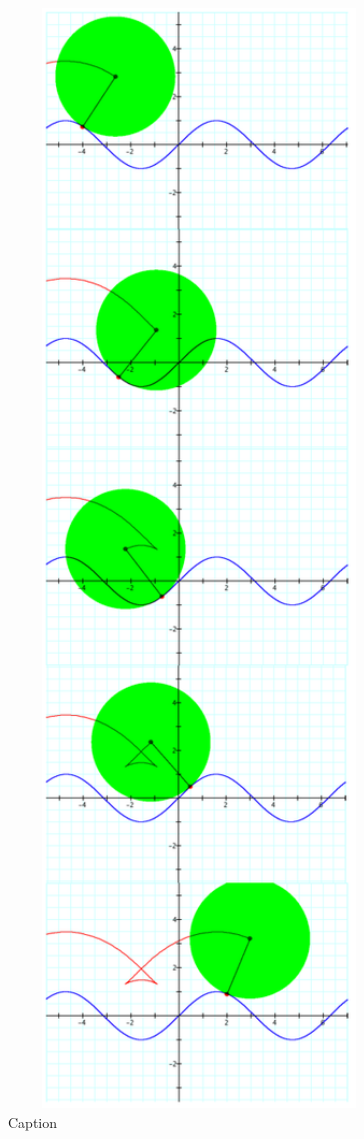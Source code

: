 \begin{figure}[h!]
\begin{minipage}[b]{0.3\linewidth}
    \caption{Caption}
    \label{fig:fig18}
    \vspace{4ex}
  \end{minipage} %
  \begin{minipage}[b]{0.3\linewidth}
    \centering
    \includegraphics[width=0.9\textwidth, height=0.5\textheight, keepaspectratio]{findig-crunch-spots-img/Fig 19.png}

\end{minipage}
\end{figure}
